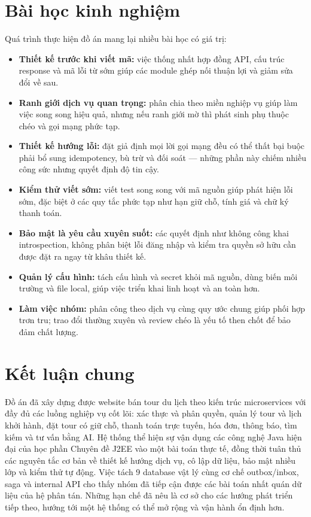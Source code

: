 \section{Bài học kinh nghiệm}
\label{sec:bai-hoc}

Quá trình thực hiện đồ án mang lại nhiều bài học có giá trị:

\begin{itemize}
  \item \textbf{Thiết kế trước khi viết mã:} việc thống nhất hợp đồng API, cấu trúc response và mã lỗi từ sớm giúp các module ghép nối thuận lợi và giảm sửa đổi về sau.
  \item \textbf{Ranh giới dịch vụ quan trọng:} phân chia theo miền nghiệp vụ giúp làm việc song song hiệu quả, nhưng nếu ranh giới mờ thì phát sinh phụ thuộc chéo và gọi mạng phức tạp.
  \item \textbf{Thiết kế hướng lỗi:} đặt giả định mọi lời gọi mạng đều có thể thất bại buộc phải bổ sung idempotency, bù trừ và đối soát — những phần này chiếm nhiều công sức nhưng quyết định độ tin cậy.
  \item \textbf{Kiểm thử viết sớm:} viết test song song với mã nguồn giúp phát hiện lỗi sớm, đặc biệt ở các quy tắc phức tạp như hạn giữ chỗ, tính giá và chữ ký thanh toán.
  \item \textbf{Bảo mật là yêu cầu xuyên suốt:} các quyết định như không công khai introspection, không phân biệt lỗi đăng nhập và kiểm tra quyền sở hữu cần được đặt ra ngay từ khâu thiết kế.
  \item \textbf{Quản lý cấu hình:} tách cấu hình và secret khỏi mã nguồn, dùng biến môi trường và file local, giúp việc triển khai linh hoạt và an toàn hơn.
  \item \textbf{Làm việc nhóm:} phân công theo dịch vụ cùng quy ước chung giúp phối hợp trơn tru; trao đổi thường xuyên và review chéo là yếu tố then chốt để bảo đảm chất lượng.
\end{itemize}

\section{Kết luận chung}
\label{sec:ket-luan-chung}

Đồ án đã xây dựng được website bán tour du lịch theo kiến trúc microservices với đầy đủ các luồng nghiệp vụ cốt lõi: xác thực và phân quyền, quản lý tour và lịch khởi hành, đặt tour có giữ chỗ, thanh toán trực tuyến, hóa đơn, thông báo, tìm kiếm và tư vấn bằng AI. Hệ thống thể hiện sự vận dụng các công nghệ Java hiện đại của học phần Chuyên đề J2EE vào một bài toán thực tế, đồng thời tuân thủ các nguyên tắc cơ bản về thiết kế hướng dịch vụ, cô lập dữ liệu, bảo mật nhiều lớp và kiểm thử tự động. Việc tách 9 database vật lý cùng cơ chế outbox/inbox, saga và internal API cho thấy nhóm đã tiếp cận được các bài toán nhất quán dữ liệu của hệ phân tán. Những hạn chế đã nêu là cơ sở cho các hướng phát triển tiếp theo, hướng tới một hệ thống có thể mở rộng và vận hành ổn định hơn.
